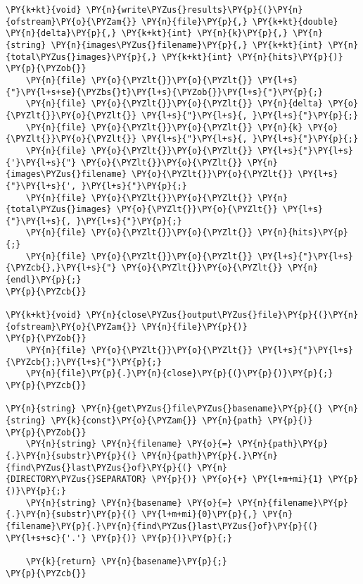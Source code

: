 \begin{Verbatim}[commandchars=\\\{\}]
\PY{k+kt}{void} \PY{n}{write\PYZus{}results}\PY{p}{(}\PY{n}{ofstream}\PY{o}{\PYZam{}} \PY{n}{file}\PY{p}{,} \PY{k+kt}{double} \PY{n}{delta}\PY{p}{,} \PY{k+kt}{int} \PY{n}{k}\PY{p}{,} \PY{n}{string} \PY{n}{images\PYZus{}filename}\PY{p}{,} \PY{k+kt}{int} \PY{n}{total\PYZus{}images}\PY{p}{,} \PY{k+kt}{int} \PY{n}{hits}\PY{p}{)}
\PY{p}{\PYZob{}}
	\PY{n}{file} \PY{o}{\PYZlt{}}\PY{o}{\PYZlt{}} \PY{l+s}{"}\PY{l+s+se}{\PYZbs{}t}\PY{l+s}{\PYZob{}}\PY{l+s}{"}\PY{p}{;}
	\PY{n}{file} \PY{o}{\PYZlt{}}\PY{o}{\PYZlt{}} \PY{n}{delta} \PY{o}{\PYZlt{}}\PY{o}{\PYZlt{}} \PY{l+s}{"}\PY{l+s}{, }\PY{l+s}{"}\PY{p}{;}
	\PY{n}{file} \PY{o}{\PYZlt{}}\PY{o}{\PYZlt{}} \PY{n}{k} \PY{o}{\PYZlt{}}\PY{o}{\PYZlt{}} \PY{l+s}{"}\PY{l+s}{, }\PY{l+s}{"}\PY{p}{;}
	\PY{n}{file} \PY{o}{\PYZlt{}}\PY{o}{\PYZlt{}} \PY{l+s}{"}\PY{l+s}{'}\PY{l+s}{"} \PY{o}{\PYZlt{}}\PY{o}{\PYZlt{}} \PY{n}{images\PYZus{}filename} \PY{o}{\PYZlt{}}\PY{o}{\PYZlt{}} \PY{l+s}{"}\PY{l+s}{', }\PY{l+s}{"}\PY{p}{;}
	\PY{n}{file} \PY{o}{\PYZlt{}}\PY{o}{\PYZlt{}} \PY{n}{total\PYZus{}images} \PY{o}{\PYZlt{}}\PY{o}{\PYZlt{}} \PY{l+s}{"}\PY{l+s}{, }\PY{l+s}{"}\PY{p}{;}
	\PY{n}{file} \PY{o}{\PYZlt{}}\PY{o}{\PYZlt{}} \PY{n}{hits}\PY{p}{;}
	\PY{n}{file} \PY{o}{\PYZlt{}}\PY{o}{\PYZlt{}} \PY{l+s}{"}\PY{l+s}{\PYZcb{},}\PY{l+s}{"} \PY{o}{\PYZlt{}}\PY{o}{\PYZlt{}} \PY{n}{endl}\PY{p}{;}
\PY{p}{\PYZcb{}}

\PY{k+kt}{void} \PY{n}{close\PYZus{}output\PYZus{}file}\PY{p}{(}\PY{n}{ofstream}\PY{o}{\PYZam{}} \PY{n}{file}\PY{p}{)}
\PY{p}{\PYZob{}}
	\PY{n}{file} \PY{o}{\PYZlt{}}\PY{o}{\PYZlt{}} \PY{l+s}{"}\PY{l+s}{\PYZcb{};}\PY{l+s}{"}\PY{p}{;}
	\PY{n}{file}\PY{p}{.}\PY{n}{close}\PY{p}{(}\PY{p}{)}\PY{p}{;}
\PY{p}{\PYZcb{}}

\PY{n}{string} \PY{n}{get\PYZus{}file\PYZus{}basename}\PY{p}{(} \PY{n}{string} \PY{k}{const}\PY{o}{\PYZam{}} \PY{n}{path} \PY{p}{)}
\PY{p}{\PYZob{}}
    \PY{n}{string} \PY{n}{filename} \PY{o}{=} \PY{n}{path}\PY{p}{.}\PY{n}{substr}\PY{p}{(} \PY{n}{path}\PY{p}{.}\PY{n}{find\PYZus{}last\PYZus{}of}\PY{p}{(} \PY{n}{DIRECTORY\PYZus{}SEPARATOR} \PY{p}{)} \PY{o}{+} \PY{l+m+mi}{1} \PY{p}{)}\PY{p}{;}
    \PY{n}{string} \PY{n}{basename} \PY{o}{=} \PY{n}{filename}\PY{p}{.}\PY{n}{substr}\PY{p}{(} \PY{l+m+mi}{0}\PY{p}{,} \PY{n}{filename}\PY{p}{.}\PY{n}{find\PYZus{}last\PYZus{}of}\PY{p}{(} \PY{l+s+sc}{'.'} \PY{p}{)} \PY{p}{)}\PY{p}{;}

    \PY{k}{return} \PY{n}{basename}\PY{p}{;}
\PY{p}{\PYZcb{}}
\end{Verbatim}
